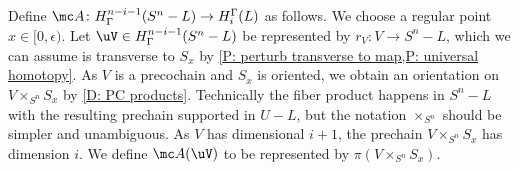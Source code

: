 \begin{example}
\begin{comment}
	We next construct a locally collapsing map near $L$.
	Let $\eta \colon [0,\infty) \to [0,\infty)$ be a smooth map that
	\begin{itemize}
	\item $\eta([0,1]) = 0$,
	\item $\eta$ is strictly increasing on $[1,2]$, and
	\item $\eta(x)=x$ for $x \geq 2$.
	\end{itemize}
	We then define $\rho \colon S^n \to S^n$ such that
	\begin{itemize}
	\item $\rho(x) = x$ if $x \in S^n - (\sqcup U_i)$,x
	\item $\rho(x) = \eta(d(x))x$ if $x \in \sqcup U_i$, where $d(x)$ is the distance from the origin in the fiber of the bundle $U_i$ containing $x$, and $\eta(d(x))x$ is similarly the scalar multiplication in the fiber.
	\end{itemize}
	By construction, $\rho$ is the identity map outside of $\sqcup U_i$, it is a diffeomorphism from $S^n-D_1$ onto $S^n-L$, and it retracts $D_1$ onto $L$ by the bundle projection.
\end{comment}


Define $\mc A \colon H^{n-i-1}_\Gamma(S^n-L) \to H_i^\Gamma(L)$ as follows.
We choose a regular point $x \in [0,\epsilon)$.
Let $\uV \in H^{n-i-1}_\Gamma(S^n-L)$ be represented by $r_V \colon V \to S^n - L$, which we can assume is transverse to $S_x$ by \cref{P: perturb transverse to map,P: universal homotopy}.
As $V$ is a precochain and $S_x$ is oriented, we obtain an orientation on $V \times_{S^n} S_x$ by \cref{D: PC products}.
Technically the fiber product happens in $S^n-L$ with the resulting prechain supported in $U-L$, but the notation $\times_{S^n}$ should be simpler and unambiguous.
As $V$ has dimensional $i+1$, the prechain $V \times_{S^n} S_x$ has dimension $i$.
We define $\mc A(\uV)$ to be represented by $\pi(V \times_{S^n} S_x)$.



\begin{comment}
	It will be useful to note for later that if $W \in PC^{i+1}(S^n)$ then by \cref{P: Leibniz cap},
	\begin{align}
	\bd (W \times_{S^n} D_x^-) &= \left[(-1)^{i+1} (\bd W) \times_{S^n} D_x^-\right] \bigsqcup (W \times_{S^n} \bd D_x^-)\notag\\
	&= \left[(-1)^{i+1} (\bd W) \times_{S^n} D_x^-\right] \bigsqcup - (W \times_{S^n} S_x). \label{E: leib bd}
	\end{align}
\end{comment}


\end{example}
